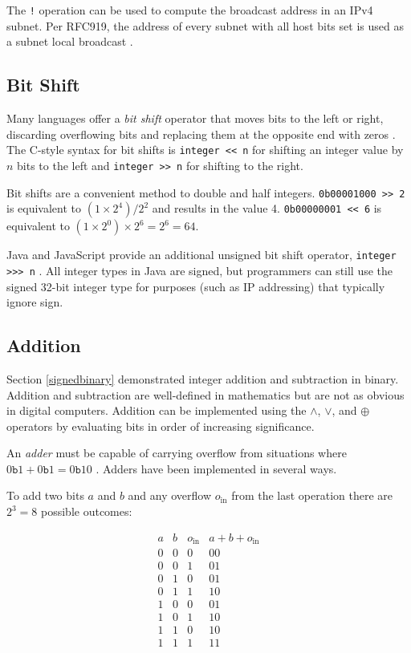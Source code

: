 \documentclass{book}
\begin{document}
The \texttt{!} operation can be used to compute the broadcast address in an IPv4 subnet. Per RFC919, the address of every subnet with all host bits set is used as a subnet local broadcast \cite{rfc919}.

\subsection{Bit Shift}

Many languages offer a \textit{bit shift} operator that moves bits to the left or right, discarding overflowing bits and replacing them at the opposite end with zeros \cite{lin_bitshift_2003}. The C-style syntax for bit shifts is \texttt{integer << n} for shifting an integer value by $n$ bits to the left and \texttt{integer >> n} for shifting to the right.

Bit shifts are a convenient method to double and half integers. \texttt{0b00001000 >> 2} is equivalent to $(1 \times 2^4)/2^{2}$ and results in the value 4. \texttt{0b00000001 << 6} is equivalent to $(1\times 2^0) \times 2^6 = 2^6 = 64$.

Java and JavaScript provide an additional unsigned bit shift operator, \texttt{integer >>> n} \cite{Gosling:2014:JLS:2636997} \cite{EcmaScript}. All integer types in Java are signed, but programmers can still use the signed 32-bit integer type for purposes (such as IP addressing) that typically ignore sign.

\subsection{Addition}

Section \ref{signedbinary} demonstrated integer addition and subtraction in binary. Addition and subtraction are well-defined in mathematics but are not as obvious in digital computers. Addition can be implemented using the $\wedge$, $\vee$, and $\oplus$ operators by evaluating bits in order of increasing significance.

An \textit{adder} must be capable of carrying overflow from situations where $0\texttt{b}1 + 0\texttt{b}1 = 0\texttt{b}10$ \cite{rosen_2004}. Adders have been implemented in several ways.

To add two bits $a$ and $b$ and any overflow $o_{\textrm{in}}$ from the last operation there are $2^3=8$ possible outcomes:

\begin{equation*}
\begin{array}{c|c|c|c}
a & b & o_{\textrm{in}} & a+b+o_{\textrm{in}} \\
\hline
0 & 0 & 0 & 00 \\
0 & 0 & 1 & 01 \\
0 & 1 & 0 & 01 \\
0 & 1 & 1 & 10 \\
1 & 0 & 0 & 01 \\
1 & 0 & 1 & 10 \\
1 & 1 & 0 & 10 \\
1 & 1 & 1 & 11
\end{array}
\end{equation*}
\end{document}

